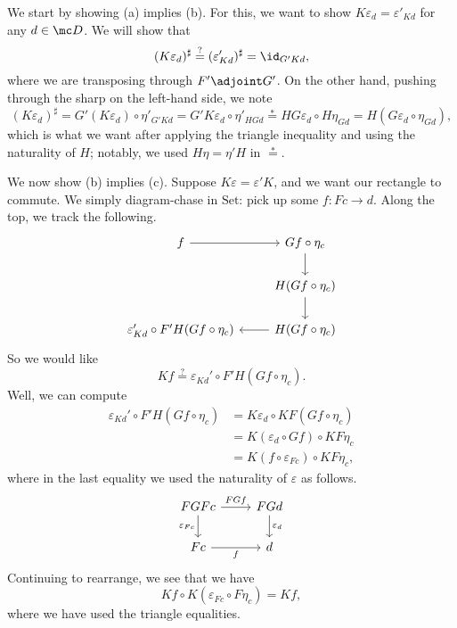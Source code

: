 We start by showing (a) implies (b). For this, we want to show $K\varepsilon_d=\varepsilon'_{Kd}$ for any $d\in\mc D$. We will show that
\[(K\varepsilon_d)^\sharp\stackrel?=(\varepsilon'_{Kd})^\sharp=\id_{G'Kd},\]
where we are transposing through $F'\adjoint G'$. On the other hand, pushing through the sharp on the left-hand side, we note
\[(K\varepsilon_d)^\sharp=G'(K\varepsilon_d)\circ\eta'_{G'Kd}=G'K\varepsilon_d\circ\eta'_{HGd}\stackrel*=HG\varepsilon_d\circ H\eta_{Gd}=H(G\varepsilon_d\circ\eta_{Gd}),\]
which is what we want after applying the triangle inequality and using the naturality of $H$; notably, we used $H\eta=\eta'H$ in $\stackrel*=$.

We now show (b) implies (c). Suppose $K\varepsilon=\varepsilon'K$, and we want our rectangle to commute. We simply diagram-chase in $\mathrm{Set}$: pick up some $f:Fc\to d$. Along the top, we track the following.
\[\begin{tikzcd}
	f & {Gf\circ\eta_c} \\
	& {H(Gf\circ\eta_c)} \\
	{\varepsilon_{Kd}'\circ F'H(Gf\circ\eta_c)} & {H(Gf\circ\eta_c)}
	\arrow[from=1-1, to=1-2]
	\arrow[from=1-2, to=2-2]
	\arrow[from=2-2, to=3-2]
	\arrow[from=3-2, to=3-1]
\end{tikzcd}\]
So we would like 
\[Kf\stackrel?=\varepsilon_{Kd}'\circ F'H(Gf\circ\eta_c).\]
Well, we can compute
\begin{align*}
	\varepsilon_{Kd}'\circ F'H(Gf\circ\eta_c) &= K\varepsilon_{d}\circ KF(Gf\circ\eta_c) \\
	&= K(\varepsilon_{d}\circ Gf)\circ KF\eta_c \\
	&= K(f\circ\varepsilon_{Fc})\circ KF\eta_c,
\end{align*}
where in the last equality we used the naturality of $\varepsilon$ as follows.
\[\begin{tikzcd}
	FGFc & FGd \\
	Fc & d
	\arrow["f"', from=2-1, to=2-2]
	\arrow["FGf", from=1-1, to=1-2]
	\arrow["{\varepsilon_d}", from=1-2, to=2-2]
	\arrow["{\varepsilon_{Fc}}"', from=1-1, to=2-1]
\end{tikzcd}\]
Continuing to rearrange, we see that we have
\[Kf\circ K(\varepsilon_{Fc}\circ F\eta_c)=Kf,\]
where we have used the triangle equalities.